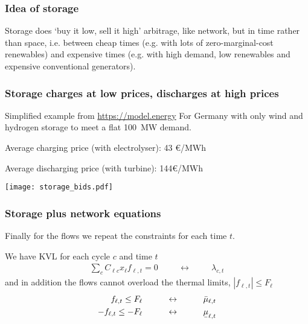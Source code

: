 \documentclass[10pt,dvipsnames]{beamer}
\def\l{\lambda}
\def\m{\mu}
\newcommand{\ubar}[1]{\text{\b{$#1$}}}
\begin{document}
\begin{frame}[fragile]
  \frametitle{Idea of storage}


  Storage does `buy it low, sell it high' arbitrage, like network, but
  in time rather than space, i.e. between cheap times (e.g. with lots
  of zero-marginal-cost renewables) and expensive times (e.g. with
  high demand, low renewables and expensive conventional generators).



\end{frame}



\begin{frame}[fragile]
  \frametitle{Storage charges at low prices, discharges at high prices}

  Simplified example from \url{https://model.energy} For Germany with only wind and hydrogen storage to meet a flat 100~MW demand.

  Average charging price (with electrolyser): 43 \euro/MWh

  Average discharging price (with turbine): 144\euro/MWh

    \centering \texttt{[image: storage\_bids.pdf]}



\end{frame}



\begin{frame}[fragile]
  \frametitle{Storage plus network equations}



  Finally for the flows we repeat the constraints for each time $t$.

  We have KVL for each cycle $c$ and time $t$
  \begin{align*}
    \sum_{c} C_{\ell c} x_\ell f_{\ell,t} = 0  \hspace{1cm}\leftrightarrow\hspace{1cm} \l_{c,t}
  \end{align*}
  and in addition the flows cannot overload the thermal limits, $|f_{\ell,t}| \leq F_\ell$
  \begin{align*}
    f_{\ell,t} \leq F_\ell  \hspace{1cm}\leftrightarrow\hspace{1cm} \bar{\m}_{\ell,t} \\
        - f_{\ell,t} \leq - F_\ell  \hspace{1cm}\leftrightarrow\hspace{1cm} \ubar{\m}_{\ell,t}
  \end{align*}

\end{frame}
\end{document}
